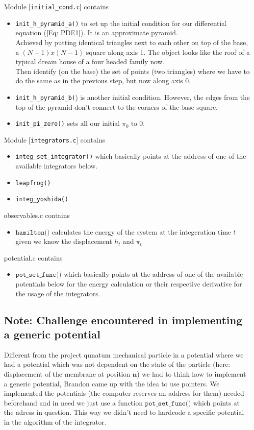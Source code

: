 \documentclass[11pt,a4paper]{article}
\begin{document}
 Module [\verb|initial_cond.c|] contains
 
\begin{itemize}
	\item \verb|init_h_pyramid_a()| to set up the initial condition for our
		differential equation (\ref{Eq: PDE1}). It is an approximate pyramid. \\
		Achieved by putting identical triangles next to each other on top of the
		base, a $(N-1)x(N-1)$ square along axis 1. The object looks like the
		roof of a typical dream house of a four headed family now.\\ Then
		identify (on the base) the set of points (two triangles) where we have
		to do the same as in the previous step, but now along axis 0.
	\item \verb|init_h_pyramid_b(|) is another initial condition. However, the
		edges from the top of the pyramid don't connect to the corners of the
		base square.
	\item \verb|init_pi_zero()| sets all our initial $\pi_{0}$ to 0.
\end{itemize}

 Module [\verb|integrators.c|] contains
\begin{itemize}
	\item \verb|integ_set_integrator()| which basically points at the address of
		one of the available integrators below.
	\item \verb|leapfrog()|
	\item \verb|integ_yoshida()|
\end{itemize}

 observables.c contains
\begin{itemize}
\item $\texttt{hamilton()}$ calculates the energy of the system at the integeration time $t$ given we know the displacement $h_t$ and $\pi_t$ 
\end{itemize} 

 potential.c contains
\begin{itemize}
\item $\texttt{pot\_set\_func()}$ which basically points at the address of one of the available potentials below for the energy calculation or their respective derivative for the usage of the integrators. 
\end{itemize}

\subsection{Note: Challenge encountered in implementing a generic potential}
Different from the project qunatum mechanical particle in a potential where we had a potential which was not dependent on the state of the particle (here: displacement of the membrane at position $\mathbf{n}$) we had to think how to implement a generic potential, Brandon came up with the idea to use pointers. We implemented the potentials (the computer reserves an address for them) needed beforehand and in need we just use a function $ \texttt{pot\_set\_func()}$ which points at the adress in question. This way we didn't need to hardcode a specific potential in the algorithm of the integrator.
\end{document}

